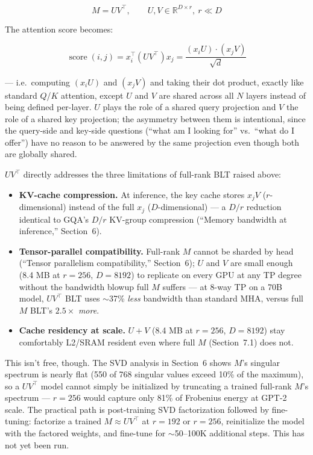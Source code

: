 \documentclass[11pt]{article}
\begin{document}
\begin{equation*}
M = UV^\top, \qquad U, V \in \mathbb{R}^{D\times r},\ r \ll D
\end{equation*}

The attention score becomes:

\begin{equation*}
\operatorname{score}(i,j) = x_i^\top (UV^\top) x_j = \frac{(x_i U)\cdot(x_j V)}{\sqrt{d}}
\end{equation*}

--- i.e.\ computing $(x_i U)$ and $(x_j V)$ and taking their dot product, exactly like standard $Q$/$K$ attention, except $U$ and $V$ are shared across all $N$ layers instead of being defined per-layer. $U$ plays the role of a shared query projection and $V$ the role of a shared key projection; the asymmetry between them is intentional, since the query-side and key-side questions (``what am I looking for'' vs.\ ``what do I offer'') have no reason to be answered by the same projection even though both are globally shared.

$UV^\top$ directly addresses the three limitations of full-rank BLT raised above:

\begin{itemize}
\item \textbf{KV-cache compression.} At inference, the key cache stores $x_j V$ ($r$-dimensional) instead of the full $x_j$ ($D$-dimensional) --- a $D/r$ reduction identical to GQA's $D/r$ KV-group compression (``Memory bandwidth at inference,'' Section~6).
\item \textbf{Tensor-parallel compatibility.} Full-rank $M$ cannot be sharded by head (``Tensor parallelism compatibility,'' Section~6); $U$ and $V$ are small enough (8.4 MB at $r=256$, $D=8192$) to replicate on every GPU at any TP degree without the bandwidth blowup full $M$ suffers --- at 8-way TP on a 70B model, $UV^\top$ BLT uses $\sim$37\% \emph{less} bandwidth than standard MHA, versus full $M$ BLT's $2.5\times$ \emph{more}.
\item \textbf{Cache residency at scale.} $U+V$ (8.4 MB at $r=256$, $D=8192$) stay comfortably L2/SRAM resident even where full $M$ (Section~7.1) does not.
\end{itemize}

This isn't free, though. The SVD analysis in Section~6 shows $M$'s singular spectrum is nearly flat (550 of 768 singular values exceed 10\% of the maximum), so a $UV^\top$ model cannot simply be initialized by truncating a trained full-rank $M$'s spectrum --- $r=256$ would capture only 81\% of Frobenius energy at GPT-2 scale. The practical path is post-training SVD factorization followed by fine-tuning: factorize a trained $M \approx UV^\top$ at $r=192$ or $r=256$, reinitialize the model with the factored weights, and fine-tune for $\sim$50--100K additional steps. This has not yet been run.
\end{document}
